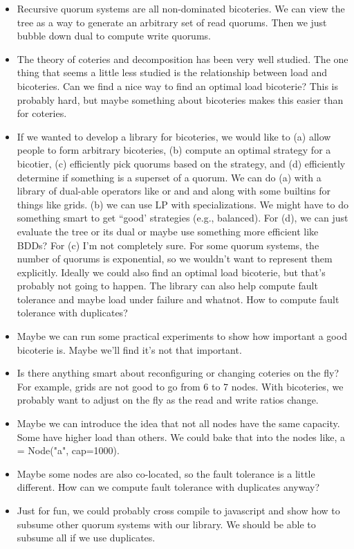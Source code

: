 \begin{itemize}
  \item
    Recursive quorum systems are all non-dominated bicoteries. We can view the
    tree as a way to generate an arbitrary set of read quorums. Then we just
    bubble down dual to compute write quorums.

  \item
    The theory of coteries and decomposition has been very well studied. The
    one thing that seems a little less studied is the relationship between load
    and bicoteries. Can we find a nice way to find an optimal load bicoterie?
    This is probably hard, but maybe something about bicoteries makes this
    easier than for coteries.

  \item
    If we wanted to develop a library for bicoteries, we would like to (a)
    allow people to form arbitrary bicoteries, (b) compute an optimal strategy
    for a bicotier, (c) efficiently pick quorums based on the strategy, and (d)
    efficiently determine if something is a superset of a quorum. We can do (a)
    with a library of dual-able operators like or and and along with some
    builtins for things like grids. (b) we can use LP with specializations. We
    might have to do something smart to get ``good' strategies (e.g.,
    balanced). For (d), we can just evaluate the tree or its dual or maybe use
    something more efficient like BDDs? For (c) I'm not completely sure. For
    some quorum systems, the number of quorums is exponential, so we wouldn't
    want to represent them explicitly. Ideally we could also find an optimal
    load bicoterie, but that's probably not going to happen. The library can
    also help compute fault tolerance and maybe load under failure and whatnot.
    How to compute fault tolerance with duplicates?

  \item
    Maybe we can run some practical experiments to show how important a good
    bicoterie is. Maybe we'll find it's not that important.

  \item
    Is there anything smart about reconfiguring or changing coteries on the
    fly? For example, grids are not good to go from 6 to 7 nodes. With
    bicoteries, we probably want to adjust on the fly as the read and write
    ratios change.

  \item
    Maybe we can introduce the idea that not all nodes have the same capacity.
    Some have higher load than others. We could bake that into the nodes like,
    a = Node("a", cap=1000).

  \item
    Maybe some nodes are also co-located, so the fault tolerance is a little
    different. How can we compute fault tolerance with duplicates anyway?

  \item
    Just for fun, we could probably cross compile to javascript and show how to
    subsume other quorum systems with our library. We should be able to subsume
    all if we use duplicates.
\end{itemize}


